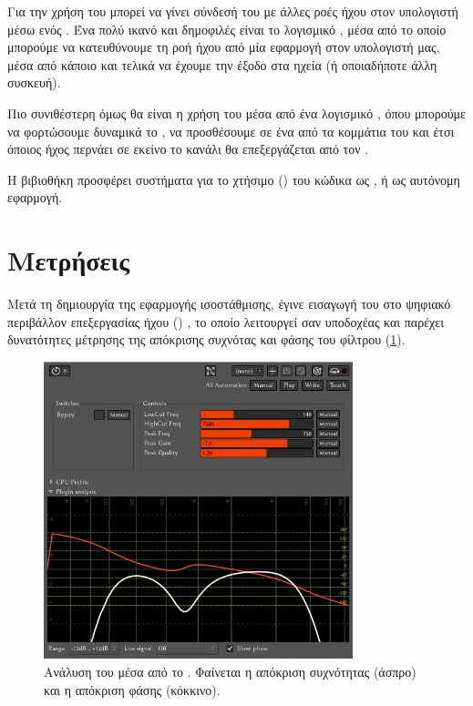 \documentclass{article}
\begin{document}
Για την χρήση του   μπορεί να γίνει 
σύνδεσή του με άλλες ροές ήχου στον υπολογιστή μέσω ενός .
Ένα πολύ ικανό και δημοφιλές είναι το λογισμικό  \cite{CarlaApp}, 
μέσα από το οποίο μπορούμε να κατευθύνουμε τη ροή ήχου από μία εφαρμογή 
στον υπολογιστή μας, μέσα από κάποιο  και τελικά να έχουμε την έξοδο 
στα ηχεία (ή οποιαδήποτε άλλη συσκευή).

Πιο συνιθέστερη όμως θα είναι η χρήση του  μέσα από ένα λογισμικό 
, όπου μπορούμε να φορτώσουμε δυναμικά 
το , να προσθέσουμε σε ένα από τα κομμάτια του  
και έτσι όποιος ήχος περνάει σε εκείνο το κανάλι θα επεξεργάζεται από τον . 

Η βιβιοθήκη  προσφέρει συστήματα για το χτήσιμο () του κώδικα 
ως  \cite{VSTWiki}, ή ως αυτόνομη εφαρμογή.  

\section{Μετρήσεις}

Μετά τη δημιουργία της εφαρμογής ισοστάθμισης, έγινε εισαγωγή του  
 στο ψηφιακό περιβάλλον επεξεργασίας ήχου () , 
το οποίο λειτουργεί σαν υποδοχέας και παρέχει δυνατότητες μέτρησης της απόκρισης συχνότας και 
φάσης του φίλτρου (\cref{fig:ardour_analysis}).

\begin{figure}[htpb]
    \centering
    \includegraphics[width=0.8\textwidth]{./assets/PluginAnalysisArdour.png}
    \caption{Ανάλυση του  μέσα από το . Φαίνεται η απόκριση συχνότητας (άσπρο) και η απόκριση φάσης (κόκκινο).}
    \label{fig:ardour_analysis}
\end{figure}
\end{document}
